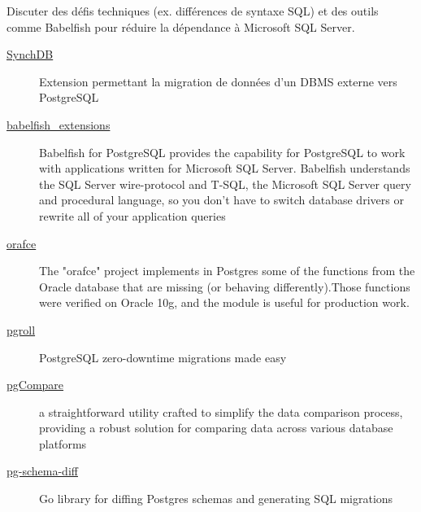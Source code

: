 \documentclass[a4paper,12pt]{article}
\begin{document}
\begin{multicols*}{2}
Discuter des défis techniques (ex. différences de syntaxe SQL) et des outils comme Babelfish pour réduire la dépendance à Microsoft SQL Server.

\begin{description}
\item[{\href{https://github.com/Hornetlabs/synchdb}{SynchDB}}] Extension permettant la migration de données d'un DBMS externe vers PostgreSQL
\item[{\href{https://github.com/babelfish-for-postgresql/babelfish\_extensions}{babelfish\_extensions}}] Babelfish for PostgreSQL provides the capability for PostgreSQL to work with applications written for Microsoft SQL Server. Babelfish understands the SQL Server wire-protocol and T-SQL, the Microsoft SQL Server query and procedural language, so you don’t have to switch database drivers or rewrite all of your application queries
\item[{\href{https://github.com/orafce/orafce}{orafce}}] The "orafce" project implements in Postgres some of the functions from the Oracle database that are missing (or behaving differently).Those functions were verified on Oracle 10g, and the module is useful for production work.
\item[{\href{https://github.com/xataio/pgroll}{pgroll}}] PostgreSQL zero-downtime migrations made easy
\item[{\href{https://github.com/CrunchyData/pgCompare}{pgCompare}}] a straightforward utility crafted to simplify the data comparison process, providing a robust solution for comparing data across various database platforms
\item[{\href{https://github.com/stripe/pg-schema-diff}{pg-schema-diff}}] Go library for diffing Postgres schemas and generating SQL migrations
\end{description}

\end{multicols*}
\end{document}
